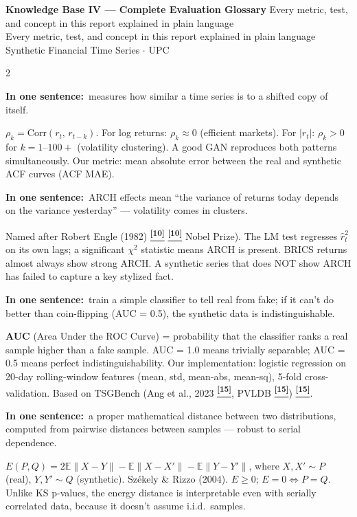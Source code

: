 \documentclass[10pt]{article}
\newcommand{\indigobox}[2]{\begin{tcolorbox}[mybox={Indigo}{IBg},title={#1}]#2\end{tcolorbox}}
\newcommand{\pagehead}[2]{%
  \begin{tcolorbox}[enhanced,arc=0pt,outer arc=0pt,boxrule=0pt,
    colback=Navy,colframe=Navy,
    top=5pt,bottom=5pt,left=8pt,right=8pt,
    before skip=0pt,after skip=10pt]
  {\color{white}\large\bfseries #1}%
  \ifx\relax#2\relax\else\\[1pt]{\color{blue!30!white}\small #2}\fi
  \hfill{\color{blue!20!white}\footnotesize Synthetic Financial Time Series $\cdot$ UPC}
  \end{tcolorbox}}
\newcommand{\tcite}[1]{%
  \hyperlink{R:#1}{\textsuperscript{\scriptsize\textbf{[#1]}}}}
\newcommand{\E}{\mathbb{E}}
\begin{document}
\clearpage

\pagehead{Knowledge Base IV --- Complete Evaluation Glossary}
         {Every metric, test, and concept in this report explained in plain language}

\begin{multicols}{2}

\indigobox{ACF / Autocorrelation Function}{%
\textbf{In one sentence:}\ measures how similar a time series is to a shifted copy of itself.

$\rho_k = \text{Corr}(r_t,\, r_{t-k})$. For log returns: $\rho_k \approx 0$ (efficient markets). For $|r_t|$: $\rho_k > 0$ for $k = 1$--$100+$ (volatility clustering). A good GAN reproduces both patterns simultaneously. Our metric: mean absolute error between the real and synthetic ACF curves (ACF MAE).}

\indigobox{ARCH Effects / ARCH-LM Test}{%
\textbf{In one sentence:}\ ARCH effects mean ``the variance of returns today depends on the variance yesterday'' --- volatility comes in clusters.

Named after Robert Engle (1982)\tcite{10}\tcite{10} Nobel Prize). The LM test regresses $\hat{r}_t^2$ on its own lags; a significant $\chi^2$ statistic means ARCH is present. BRICS returns almost always show strong ARCH. A synthetic series that does NOT show ARCH has failed to capture a key stylized fact.}

\indigobox{Discriminative AUC}{%
\textbf{In one sentence:}\ train a simple classifier to tell real from fake; if it can't do better than coin-flipping (AUC = 0.5), the synthetic data is indistinguishable.

\textbf{AUC} (Area Under the ROC Curve) = probability that the classifier ranks a real sample higher than a fake sample. AUC = 1.0 means trivially separable; AUC = 0.5 means perfect indistinguishability. Our implementation: logistic regression on 20-day rolling-window features (mean, std, mean-abs, mean-sq), 5-fold cross-validation. Based on TSGBench (Ang et al., 2023\tcite{15}, PVLDB\tcite{15})\tcite{15}.}

\indigobox{Energy Distance}{%
\textbf{In one sentence:}\ a proper mathematical distance between two distributions, computed from pairwise distances between samples --- robust to serial dependence.

$E(P,Q) = 2\E\|X-Y\| - \E\|X-X'\| - \E\|Y-Y'\|$, where $X,X' \sim P$ (real), $Y,Y' \sim Q$ (synthetic). Székely \& Rizzo (2004). $E \geq 0$; $E=0 \Leftrightarrow P=Q$. Unlike KS p-values, the energy distance is interpretable even with serially correlated data, because it doesn't assume i.i.d.\ samples.}


\end{multicols}
\end{document}
